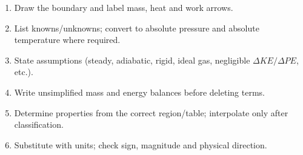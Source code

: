\documentclass[9pt,a4paper]{extarticle}
\begin{document}
\begin{quick}
\begin{enumerate}
\item Draw the boundary and label mass, heat and work arrows.
\item List knowns/unknowns; convert to absolute pressure and absolute temperature where required.
\item State assumptions (steady, adiabatic, rigid, ideal gas, negligible $\Delta KE/\Delta PE$, etc.).
\item Write unsimplified mass and energy balances before deleting terms.
\item Determine properties from the correct region/table; interpolate only after classification.
\item Substitute with units; check sign, magnitude and physical direction.
\end{enumerate}
\end{quick}
\end{document}
